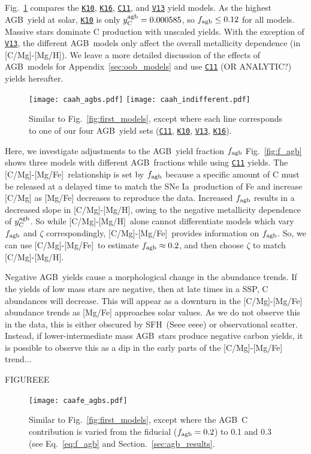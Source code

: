 \documentclass[fleqn,usenatbib]{mnras}
\newcommand{\cxi}{\texttt{\hyperlink{C11}{C11}}}
\newcommand{\kx}{\texttt{\hyperlink{K10}{K10}}}
\newcommand{\kxvi}{\texttt{\hyperlink{K16}{K16}}}
\newcommand{\vxiii}{\texttt{\hyperlink{V13}{V13}}}
\newcommand{\agb}{AGB}
\newcommand{\ia}{SNe Ia}
\newcommand{\sfh}{SFH}
\newcommand{\caah}{[C/Mg]-[Mg/H]}
\newcommand{\caafe}{[C/Mg]-[Mg/Fe]}
\newcommand{\Ycagb}{\ensuremath{y_{\rm C}^{\rm agb}}}
\begin{document}
Fig.~\ref{fig:agb_sims} compares the \kx{}, \kxvi{}, \cxi{}, and \vxiii{} yield models. As the highest \agb\ yield at solar, \kx{} is only $\Ycagb=0.000585$, so $f_{\rm agb} \leq 0.12$ for all models. 
Massive stars dominate C production with unscaled yields.  
With the exception of \vxiii, the different \agb\ models only affect the overall metallicity dependence (in \caah). We leave a more detailed discussion of the effects of \agb\ models for Appendix~\ref{sec:oob_models} and use \cxi{} (OR ANALYTIC?) yields hereafter.


\begin{figure}
\centering
\texttt{[image: caah\_agbs.pdf]}
\texttt{[image: caah\_indifferent.pdf]}

\caption[]{Similar to Fig.~\ref{fig:first_models}, except where each line corresponds to one of our four \agb\ yield sets (\cxi, \kx, \vxiii, \kxvi).}
\label{fig:agb_sims}
\end{figure}


Here, we investigate adjustments to the \agb\ yield fraction $f_{\rm agb}$
Fig.~\ref{fig:f_agb} shows three models with different \agb\ fractions while using \cxi{} yields.  The \caafe~relationship is set by $f_{\rm agb}$ because a specific amount of C must be released at a delayed time to match the \ia\ production of Fe and increase [C/Mg] as [Mg/Fe] decreases to reproduce the data.
Increased $f_{\rm agb}$ results in a decreased slope in \caah, owing to the negative metallicity dependence of $\Ycagb$. So while \caah~alone cannot differentiate models which vary $f_{\rm agb}$ and $\zeta$ correspondingly, \caafe~provides information on $f_{\rm agb}$. So, we can use \caafe~to estimate $f_{\rm agb}\approx 0.2$, and then choose $\zeta$ to match \caah.



Negative \agb\ yields cause a morphological change in the abundance trends. If the yields of low mass stars are negative, then at late times in a SSP, C abundances will decrease. This will appear as a downturn in the \caafe{} abundance trends as [Mg/Fe] approaches solar values. As we do not observe this in the data, this is either obscured by \sfh\ (Seee eeee) or observational scatter. 
Instead, if lower-intermediate mass \agb\ stars produce negative carbon yields, it is possible to observe this as a dip in the early parts of the \caafe{} trend...

FIGUREEE


\begin{figure}
\centering
\texttt{[image: caafe\_agbs.pdf]}

\caption[]{Similar to Fig.~\ref{fig:first_models}, except where the \agb\ C contribution is varied from the fiducial ($f_{\rm agb}=0.2$) to 0.1 and 0.3 (see Eq.~\ref{eq:f_agb} and Section.~\ref{sec:agb_results}.}
\label{fig:caafe_agbs}
\end{figure}
\end{document}
